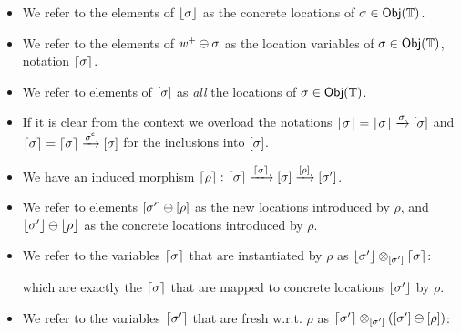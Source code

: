 \begin{notation}
\noindent
\begin{itemize}
    \item We refer to the elements of $\lfloor\sigma\rfloor$ as the concrete locations of $\sigma \in \mathsf{Obj}({\mathbb{T}})$.
    \item We refer to the elements of ${\mathit{w}}^+ \ominus \sigma$ as the location variables of $\sigma \in \mathsf{Obj}({\mathbb{T}})$, notation $\lceil\sigma\rceil$.
    \item We refer to elements of $[\sigma]$ as \emph{all} the locations of $\sigma \in \mathsf{Obj}({\mathbb{T}})$.
    \item If it is clear from the context we overload the notations $\lfloor\sigma\rfloor = \lfloor\sigma\rfloor \xrightarrow\sigma [\sigma]$ and
        $\lceil\sigma\rceil = \lceil\sigma\rceil \xrightarrow{{\sigma}^\mathsf{c}} [\sigma]$ for the inclusions into $[\sigma]$.
    \item We have an induced morphism $\lceil\rho\rceil : \lceil\sigma\rceil \xrightarrow{\lceil\sigma\rceil} [\sigma] \xrightarrow{[\rho]} [\sigma']$.
    \item We refer to elements $[\sigma'] \ominus [\rho]$ as the new locations introduced by $\rho$, 
          and $\lfloor\sigma'\rfloor \ominus \lfloor\rho\rfloor$ as the concrete locations introduced by $\rho$.
    \item We refer to the variables $\lceil\sigma\rceil$ that are instantiated by $\rho$ as $\lfloor\sigma'\rfloor \otimes_{[\sigma']} \lceil\sigma\rceil$: 
        \begin{center}
        \end{center}
            which are exactly the $\lceil\sigma\rceil$ that are mapped to concrete locations $\lfloor\sigma'\rfloor$ by $\rho$.
    \item We refer to the variables $\lceil\sigma'\rceil$ that are fresh w.r.t. $\rho$ as $\lceil\sigma'\rceil \otimes_{[\sigma']} ([\sigma'] \ominus [\rho])$: 
        \begin{center}
\end{center}
\end{itemize}
\end{notation}
